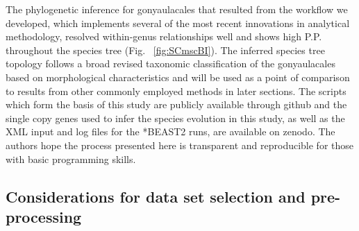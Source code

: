 \documentclass[12pt]{article}
\begin{document}
The phylogenetic inference for gonyaulacales that resulted from the workflow we developed, which implements several of the most recent innovations in analytical methodology, resolved within-genus relationships well and shows high P.P. throughout the species tree (Fig. ~\ref{fig:SCmscBI}). 
The inferred species tree topology follows a broad revised taxonomic classification of the gonyaulacales based on morphological characteristics \cite{hoppenrath2017dinoflagellate} and will be used as a point of comparison to results from other commonly employed methods in later sections. 
The scripts which form the basis of this study are publicly available through github and the single copy genes used to infer the species evolution in this study, as well as the XML input and log files for the *BEAST2 runs, are available on zenodo. 
The authors hope the process presented here is transparent and reproducible for those with basic programming skills. 

\subsection{Considerations for data set selection and pre-processing}
\end{document}
